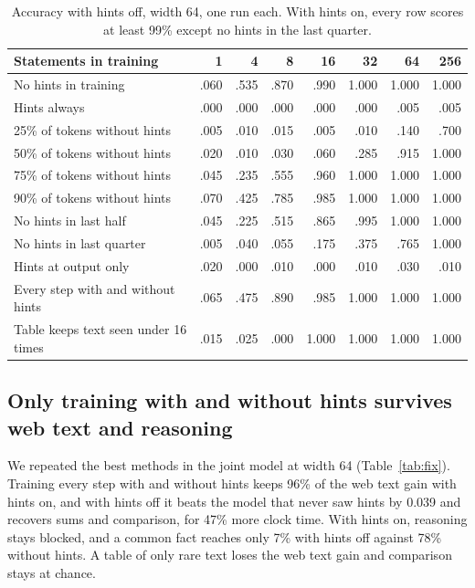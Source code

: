 \documentclass[11pt]{article}
\begin{document}
\begin{table}[h]\centering\small
\begin{tabular}{lrrrrrrr}\toprule
Statements in training & 1 & 4 & 8 & 16 & 32 & 64 & 256\\\midrule
No hints in training & .060 & .535 & .870 & .990 & 1.000 & 1.000 & 1.000\\
Hints always & .000 & .000 & .000 & .000 & .000 & .005 & .005\\
25\% of tokens without hints & .005 & .010 & .015 & .005 & .010 & .140 & .700\\
50\% of tokens without hints & .020 & .010 & .030 & .060 & .285 & .915 & 1.000\\
75\% of tokens without hints & .045 & .235 & .555 & .960 & 1.000 & 1.000 & 1.000\\
90\% of tokens without hints & .070 & .425 & .785 & .985 & 1.000 & 1.000 & 1.000\\
No hints in last half & .045 & .225 & .515 & .865 & .995 & 1.000 & 1.000\\
No hints in last quarter & .005 & .040 & .055 & .175 & .375 & .765 & 1.000\\
Hints at output only & .020 & .000 & .010 & .000 & .010 & .030 & .010\\
Every step with and without hints & .065 & .475 & .890 & .985 & 1.000 & 1.000 & 1.000\\
Table keeps text seen under 16 times & .015 & .025 & .000 & 1.000 & 1.000 & 1.000 & 1.000\\\bottomrule
\end{tabular}
\caption{Accuracy with hints off, width 64, one run each. With hints on, every row scores at least 99\% except no hints in the last quarter.}\label{tab:mitigate}
\end{table}

\subsection{Only training with and without hints survives web text and reasoning}
We repeated the best methods in the joint model at width 64 (Table~\ref{tab:fix}). Training every step with and without hints keeps 96\% of the web text gain with hints on, and with hints off it beats the model that never saw hints by 0.039 and recovers sums and comparison, for 47\% more clock time. With hints on, reasoning stays blocked, and a common fact reaches only 7\% with hints off against 78\% without hints. A table of only rare text loses the web text gain and comparison stays at chance.
\end{document}
